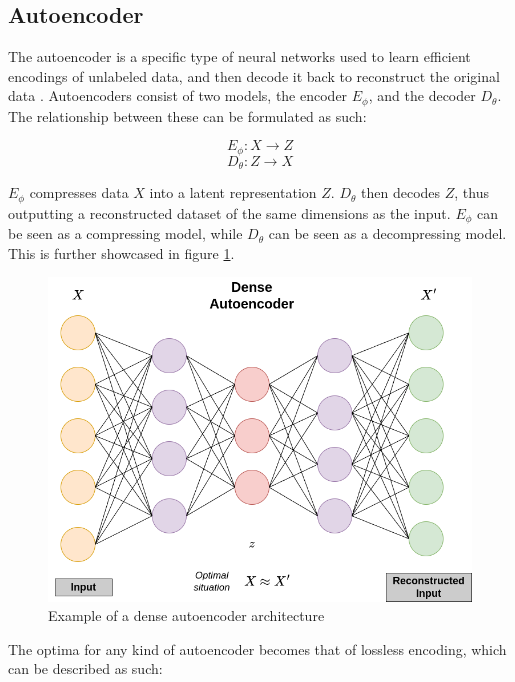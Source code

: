 \subsection{Autoencoder}

The autoencoder is a specific type of neural networks used to learn efficient encodings of unlabeled data, and then decode it back to reconstruct the original data \cite{bank2021autoencoders}. Autoencoders consist of two models, the encoder $E_\phi$, and the decoder $D_\theta$. The relationship between these can be formulated as such: 

\begin{equation}\label{eq:enc}
E_\phi: X \rightarrow Z 
\end{equation}
\begin{equation}\label{eq:dec}
D_\theta: Z \rightarrow X
\end{equation}

$E_\phi$ compresses data $X$ into a latent representation $Z$. $D_\theta$ then decodes $Z$, thus outputting a reconstructed dataset of the same dimensions as the input. $E_\phi$ can be seen as a compressing model, while $D_\theta$ can be seen as a decompressing model. This is further showcased in figure \ref{fig:aediagram}. 

\begin{figure}[!h]
    \centering
    \includegraphics[scale=0.4]{figures/ae.png}
    \caption{Example of a dense autoencoder architecture}
    \label{fig:aediagram}
\end{figure}

The optima for any kind of autoencoder becomes that of lossless encoding, which can be described as such:

